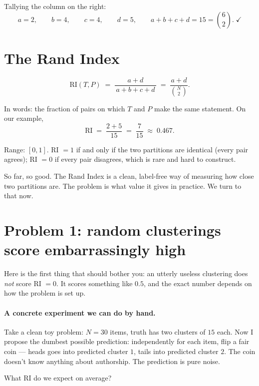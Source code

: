 \documentclass[11pt]{article}
\begin{document}
Tallying the column on the right:
\[
  a = 2, \qquad b = 4, \qquad c = 4, \qquad d = 5,
  \qquad a + b + c + d = 15 = \binom{6}{2}. \;\checkmark
\]

\section{The Rand Index}

\begin{keybox}
\[
  \text{RI}(T, P) \;=\; \frac{a + d}{\,a + b + c + d\,} \;=\; \frac{a + d}{\binom{N}{2}}.
\]
\end{keybox}

In words: the fraction of pairs on which $T$ and $P$ make the same
statement. On our example,
\[
  \text{RI} \;=\; \frac{2 + 5}{15} \;=\; \frac{7}{15} \;\approx\; 0.467.
\]

Range: $[0, 1]$. RI $= 1$ if and only if the two partitions are identical
(every pair agrees); RI $= 0$ if every pair disagrees, which is rare and
hard to construct.

So far, so good. The Rand Index is a clean, label-free way of measuring
how close two partitions are. The problem is what value it gives in
practice. We turn to that now.

\section{Problem 1: random clusterings score embarrassingly high}
\label{sec:problem1}

Here is the first thing that should bother you: an utterly useless
clustering does \emph{not} score RI $= 0$. It scores something like $0.5$,
and the exact number depends on how the problem is set up.

\paragraph{A concrete experiment we can do by hand.}
Take a clean toy problem: $N = 30$ items, truth has two clusters of $15$
each. Now I propose the dumbest possible prediction: independently for
each item, flip a fair coin --- heads goes into predicted cluster $1$,
tails into predicted cluster $2$. The coin doesn't know anything about
authorship. The prediction is pure noise.

What RI do we expect on average?
\end{document}
